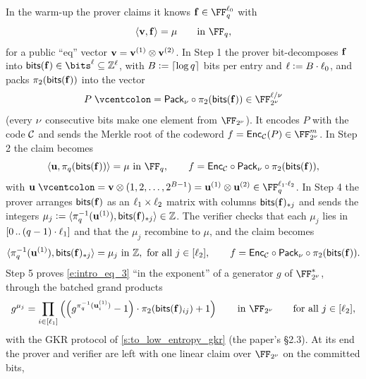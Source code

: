 \documentclass[11pt,letterpaper,usenames,dvipsnames]{article}
\begin{document}
In the warm-up the prover claims it knows $\bff\in\FF_q^{\codedim_0}$ with
%
\begin{equation}\label{e:new_to_0}\langle \vv, \bff\rangle =\mu \qquad \text{in  } \FF_q,
\end{equation}
%
for a public ``eq'' vector $\mathbf{v}=\mathbf{v}^{(1)}\otimes\mathbf{v}^{(2)}$. In Step 1 the prover bit-decomposes $\mathbf{f}$ into $\bitstext(\bff)\in\bits^\codedim\subseteq\ZZ^\codedim$, with $B{\;\vcentcolon=\;}\lceil\log q\rceil$ bits per entry and $\ell{\;\vcentcolon=\;} B\cdot\ell_0$, and packs $\pi_2(\mathsf{bits}(\mathbf{f}))$ into the vector
%
\begin{equation}\label{e:to_packed}
P\defeq \pack\circ\pi_2(\bitstext(\bff))\in \comfield^{\codedim/\comfieldexp}
\end{equation}
%
(every $\nu$ consecutive bits make one element from $\comfield$). It encodes $P$ with the code $\mathcal{C}$ and sends the Merkle root of the codeword $f=\Enc_\cC(P)\in\comfield^{\codelength}$. In Step 2 the claim becomes
%
\begin{equation}\label{e:intro_eq_2}\langle \uu, \pi_q(\bitstext(\bff))\rangle =\mu \ \text{in  } \FF_q, \qquad f = \Enc_\cC\circ \pack \circ \pi_2(\bitstext(\bff)),
\end{equation}
%
with $\uu\defeq\vv\otimes(1,2,\ldots,2^{B-1})=\uu^{(1)}\otimes\uu^{(2)}\in\FF_q^{\codedim_1\cdot\codedim_2}$. In Step 4 the prover arranges $\mathsf{bits}(\mathbf{f})$ as an $\ell_1\times\ell_2$ matrix with columns $\mathsf{bits}(\mathbf{f})_{*j}$ and sends the integers $\mu_j{\;\vcentcolon=\;}\langle\pi_q^{-1}(\mathbf{u}^{(1)}),\mathsf{bits}(\mathbf{f})_{*j}\rangle\in\mathbb{Z}$. The verifier checks that each $\mu_j$ lies in $[0 \, .. \, (q-1)\cdot\ell_1]$ and that the $\mu_j$ recombine to $\mu$, and the claim becomes
%
\begin{equation}\label{e:intro_eq_3}\langle \pi_q^{-1}(\mathbf{u}^{(1)}), \mathsf{bits}(\mathbf{f})_{*j}\rangle =\mu_j \ \text{in  } \mathbb{Z}, \text{ for all } j\in [\ell_2], \qquad f = \mathsf{Enc}_{\mathcal{C}}\circ \mathsf{Pack}_\nu \circ \pi_2(\mathsf{bits}(\mathbf{f})).
\end{equation}
%
Step 5 proves \eqref{e:intro_eq_3} ``in the exponent'' of a generator $g$ of $\comfield^*$, through the batched grand products
%
\begin{equation}\label{e:intro_eq_4}
g^{\mu_j} = \prod_{i\in [\codedim_1]} \left(\left(g^{\pi_q^{-1}(\uu_i^{(1)})} -1\right)\cdot \pi_2(\bitstext(\bff)_{ij})  +1\right) \qquad \text{in  } \comfield \qquad \text{for all } j\in [\codedim_2],
\end{equation}
%
with the GKR protocol of \cref{s:to_low_entropy_gkr} (the paper's \S2.3). At its end the prover and verifier are left with one linear claim over $\comfield$ on the committed bits,
\end{document}
